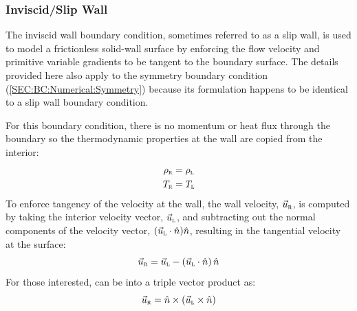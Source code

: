 \subsubsection{Inviscid\slash Slip Wall}\label{SEC:BC:Wall:Slip}

The inviscid wall boundary condition, sometimes referred to as a slip wall, is
used to model a frictionless solid-wall surface by enforcing the flow velocity
and primitive variable gradients to be tangent to the boundary surface.
%
The details provided here also apply to the symmetry boundary condition
(\ref{SEC:BC:Numerical:Symmetry}) because its formulation happens to be
identical to a slip wall boundary condition.


For this boundary condition, there is no momentum or heat flux through the
boundary so the thermodynamic properties at the wall are copied from the
interior:
%
\begin{alignat*}{1}
  \rho_{\textsc{r}} & = \rho_{\textsc{l}} \\
  T_{\textsc{r}} & = T_{\textsc{l}}
\end{alignat*}
%
To enforce tangency of the velocity at the wall, the wall velocity,
$\vec{u}_{\textsc{r}}$, is computed by taking the interior velocity vector,
$\vec{u}_{\textsc{l}}$, and subtracting out the normal components of the velocity
vector, $(\vec{u}_{\textsc{l}}\cdot\hat{n})\hat{n}$, resulting in the tangential
velocity at the surface:
%
\begin{equation}
  \vec{u}_{\textsc{r}} = \vec{u}_{\textsc{l}} - \left(\vec{u}_{\textsc{l}}\cdot\hat{n}\right)\hat{n}
  \label{EQ:BC:TangentialVelocity}
\end{equation}
%
For those interested,  can be
 into a triple vector product as:
%
\begin{equation*}
  \vec{u}_{\textsc{r}} = \hat{n}\times\left(\vec{u}_{\textsc{l}}\times\hat{n}\right)
\end{equation*}
 

